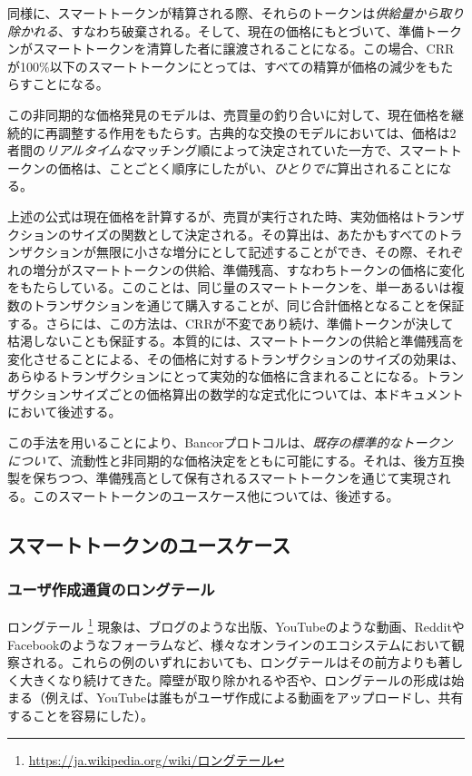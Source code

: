 \documentclass{jsarticle}
\begin{document}
  同様に、スマートトークンが精算される際、それらのトークンは\emph{供給量から取り除かれる}、すなわち破棄される。そして、現在の価格にもとづいて、準備トークンがスマートトークンを清算した者に譲渡されることになる。この場合、CRRが100\%以下のスマートトークンにとっては、すべての精算が価格の減少をもたらすことになる。

  この非同期的な価格発見のモデルは、売買量の釣り合いに対して、現在価格を継続的に再調整する作用をもたらす。古典的な交換のモデルにおいては、価格は2者間の\emph{リアルタイムな}マッチング順によって決定されていた一方で、スマートトークンの価格は、ことごとく順序にしたがい、\emph{ひとりでに}算出されることになる。

  上述の公式は現在価格を計算するが、売買が実行された時、実効価格はトランザクションのサイズの関数として決定される。その算出は、あたかもすべてのトランザクションが無限に小さな増分にとして記述することができ、その際、それぞれの増分がスマートトークンの供給、準備残高、すなわちトークンの価格に変化をもたらしている。このことは、同じ量のスマートトークンを、単一あるいは複数のトランザクションを通じて購入することが、同じ合計価格となることを保証する。さらには、この方法は、CRRが不変であり続け、準備トークンが決して枯渇しないことも保証する。本質的には、スマートトークンの供給と準備残高を変化させることによる、その価格に対するトランザクションのサイズの効果は、あらゆるトランザクションにとって実効的な価格に含まれることになる。トランザクションサイズごとの価格算出の数学的な定式化については、本ドキュメントにおいて後述する。

  この手法を用いることにより、Bancorプロトコルは、\emph{既存の標準的なトークンについて}、流動性と非同期的な価格決定をともに可能にする。それは、後方互換製を保ちつつ、準備残高として保有されるスマートトークンを通じて実現される。このスマートトークンのユースケース他については、後述する。

  \subsection{スマートトークンのユースケース}

    \subsubsection{ユーザ作成通貨のロングテール}

    ロングテール
    \footnote{\url{https://ja.wikipedia.org/wiki/ロングテール}}
    現象は、ブログのような出版、YouTubeのような動画、RedditやFacebookのようなフォーラムなど、様々なオンラインのエコシステムにおいて観察される。これらの例のいずれにおいても、ロングテールはその前方よりも著しく大きくなり続けてきた。障壁が取り除かれるや否や、ロングテールの形成は始まる（例えば、YouTubeは誰もがユーザ作成による動画をアップロードし、共有することを容易にした）。
\end{document}
